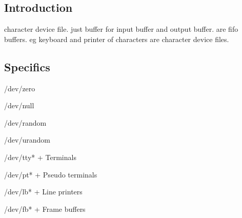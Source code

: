 
\subsection{Introduction}

character device file. just buffer for input buffer and output buffer. are fifo buffers. eg keyboard and printer of characters are character device files.

\subsection{Specifics}
/dev/zero

/dev/null

/dev/random

/dev/urandom

/dev/tty*
+ Terminals

/dev/pt*
+ Pseudo terminals

/dev/lb*
+ Line printers

/dev/fb*
+ Frame buffers
